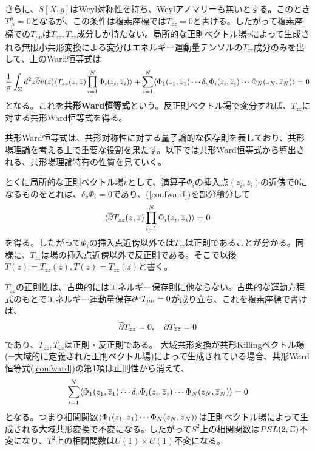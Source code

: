 さらに、$S[X,g]$はWeyl対称性を持ち、Weylアノマリーも無いとする。このとき$T^{\mu}_{\ \mu}=0$となるが、この条件は複素座標では$T_{z\overline{z}}=0$と書ける。したがって複素座標での$T_{\mu\nu}$は$T_{zz},T_{\overline{z}\overline{z}}$成分しか持たない。局所的な正則ベクトル場$v$によって生成される無限小共形変換による変分はエネルギー運動量テンソルの$T_{zz}$成分のみを出して、上のWard恒等式は
\begin{align}\label{confward}
\frac{1}{\pi}\int_\Sigma d^2 z \overline{\partial}v(z)\langle T_{zz}(z,\overline{z})\prod_{i=1}^N \Phi_i(z_i,\overline{z}_i) \rangle+ \sum_{i=1}^{N} \langle \Phi_1(z_1,\overline{z}_1)\cdots\delta_v \Phi_i(z_i,\overline{z}_i)\cdots \Phi_N(z_N,\overline{z}_N) \rangle=0
\end{align}
となる。これを\textbf{共形Ward恒等式}という。反正則ベクトル場で変分すれば、$T_{\overline{z}\overline{z}}$に対する共形Ward恒等式を得る。

共形Ward恒等式は、共形対称性に対する量子論的な保存則を表しており、共形場理論を考える上で重要な役割を果たす。以下では共形Ward恒等式から導出される、共形場理論特有の性質を見ていく。

とくに局所的な正則ベクトル場$v$として、演算子$\Phi_i$の挿入点$(z_i,\overline{z}_i)$の近傍で$0$になるものをとれば、$\delta_v \Phi_i=0$であり、(\ref{confward})を部分積分して
\begin{align}
\langle \overline{\partial} T_{zz}(z,\overline{z})\prod_{i=1}^N \Phi_i(z_i,\overline{z}_i) \rangle=0
\end{align}
を得る。したがって$\Phi_i$の挿入点近傍以外では$T_{zz}$は正則であることが分かる。同様に、$T_{\overline{z}\overline{z}}$は場の挿入点近傍以外で反正則である。そこで以後$T(z)=T_{zz}(z),\overline{T}(\overline{z})=T_{\overline{z}\overline{z}}(\overline{z})$と書く。

$T_{zz}$の正則性は、古典的にはエネルギー保存則に他ならない。古典的な運動方程式のもとでエネルギー運動量保存$\partial^\mu T_{\mu\nu}=0$が成り立ち、これを複素座標で書けば、
\begin{align}
\overline{\partial} T_{zz}=0,\quad \partial T_{\overline{z}\overline{z}}=0
\end{align}
であり、$T_{zz},T_{\overline{z}\overline{z}}$は正則・反正則である。
大域共形変換が共形Killingベクトル場(=大域的に定義された正則ベクトル場)によって生成されている場合、共形Ward恒等式(\ref{confward})の第1項は正則性から消えて、
\begin{align}
\sum_{i=1}^{N} \langle \Phi_1(z_1,\overline{z}_1)\cdots\delta_v \Phi_i(z_i,\overline{z}_i)\cdots \Phi_N(z_N,\overline{z}_N) \rangle=0
\end{align}
となる。つまり相関関数$\langle \Phi_1(z_1,\overline{z}_1)\cdots\Phi_N(z_N,\overline{z}_N) \rangle$は正則ベクトル場によって生成される大域共形変換で不変になる。したがって$S^2$上の相関関数は$PSL(2,\mathbb{C})$不変になり、$T^2$上の相関関数は$U(1)\times U(1)$不変になる。

